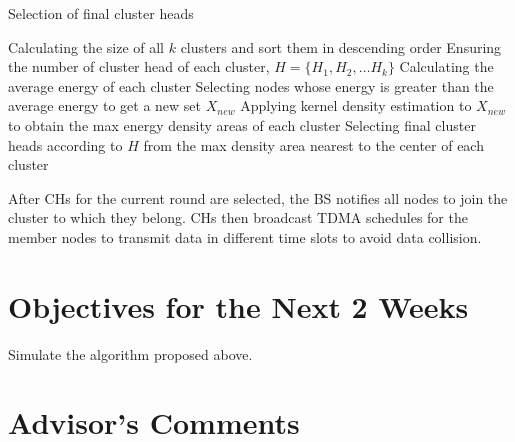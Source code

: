 \documentclass[11pt]{report}
\begin{document}
	\begin{algorithm}[H]
		\caption{Selection of final cluster heads}
		\LinesNumbered %
		Calculating the size of all $k$ clusters and sort them in descending order\;
		Ensuring the number of cluster head of each cluster, $H=\{H_1, H_2, \dots H_k \}$\;
		Calculating the average energy of each cluster\;
		Selecting nodes whose energy is greater than the average energy to get a new set $X_{new}$\;
		Applying kernel density estimation to $X_{new}$ to obtain the max energy density areas of each cluster\;
		Selecting final cluster heads according to $H$ from the max density area nearest to the center of each cluster
	\end{algorithm}
	
	
	\noindent After CHs for the current round are selected, the BS notifies all nodes to join the cluster to which they belong. CHs then broadcast TDMA schedules for the member nodes to transmit data in different time slots to avoid data collision.
	

	
	\section{Objectives for the Next 2 Weeks}
	Simulate the algorithm proposed above.
										
	
	
	\section{Advisor's Comments}
	
	
	
	
\end{document}
